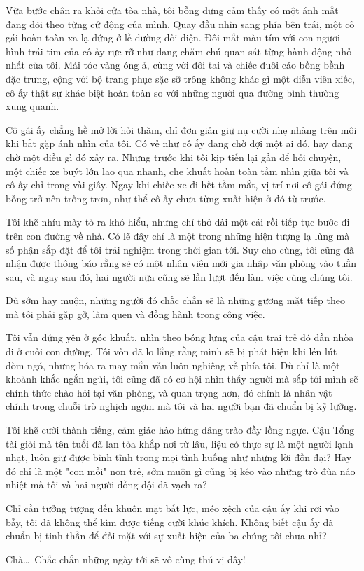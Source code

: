 \documentclass[../main.tex]{subfiles}
\begin{document}
Vừa bước chân ra khỏi cửa tòa nhà, tôi bỗng dưng cảm thấy có một ánh mắt đang dõi theo từng cử động của mình. Quay đầu nhìn sang phía bên trái, một cô gái hoàn toàn xa lạ đứng ở lề đường đối diện. Đôi mắt màu tím với con ngươi hình trái tim của cô ấy rực rỡ như đang chăm chú quan sát từng hành động nhỏ nhất của tôi. Mái tóc vàng óng ả, cùng với đôi tai và chiếc đuôi cáo bồng bềnh đặc trưng, cộng với bộ trang phục sặc sỡ trông không khác gì một diễn viên xiếc, cô ấy thật sự khác biệt hoàn toàn so với những người qua đường bình thường xung quanh.

Cô gái ấy chẳng hề mở lời hỏi thăm, chỉ đơn giản giữ nụ cười nhẹ nhàng trên môi khi bắt gặp ánh nhìn của tôi. Có vẻ như cô ấy đang chờ đợi một ai đó, hay đang chờ một điều gì đó xảy ra. Nhưng trước khi tôi kịp tiến lại gần để hỏi chuyện, một chiếc xe buýt lớn lao qua nhanh, che khuất hoàn toàn tầm nhìn giữa tôi và cô ấy chỉ trong vài giây. Ngay khi chiếc xe đi hết tầm mắt, vị trí nơi cô gái đứng bỗng trở nên trống trơn, như thể cô ấy chưa từng xuất hiện ở đó từ trước.

Tôi khẽ nhíu mày tỏ ra khó hiểu, nhưng chỉ thở dài một cái rồi tiếp tục bước đi trên con đường về nhà. Có lẽ đây chỉ là một trong những hiện tượng lạ lùng mà số phận sắp đặt để tôi trải nghiệm trong thời gian tới. Suy cho cùng, tôi cũng đã nhận được thông báo rằng sẽ có một nhân viên mới gia nhập văn phòng vào tuần sau, và ngay sau đó, hai người nữa cũng sẽ lần lượt đến làm việc cùng chúng tôi.

Dù sớm hay muộn, những người đó chắc chắn sẽ là những gương mặt tiếp theo mà tôi phải gặp gỡ, làm quen và đồng hành trong công việc.


Tôi vẫn đứng yên ở góc khuất, nhìn theo bóng lưng của cậu trai trẻ đó dần nhòa đi ở cuối con đường. Tôi vốn đã lo lắng rằng mình sẽ bị phát hiện khi lén lút dòm ngó, nhưng hóa ra may mắn vẫn luôn nghiêng về phía tôi. Dù chỉ là một khoảnh khắc ngắn ngủi, tôi cũng đã có cơ hội nhìn thấy người mà sắp tới mình sẽ chính thức chào hỏi tại văn phòng, và quan trọng hơn, đó chính là nhân vật chính trong chuỗi trò nghịch ngợm mà tôi và hai người bạn đã chuẩn bị kỹ lưỡng.

Tôi khẽ cười thành tiếng, cảm giác hào hứng dâng trào đầy lồng ngực. Cậu Tổng tài giỏi mà tên tuổi đã lan tỏa khắp nơi từ lâu, liệu có thực sự là một người lạnh nhạt, luôn giữ được bình tĩnh trong mọi tình huống như những lời đồn đại? Hay đó chỉ là một "con mồi" non trẻ, sớm muộn gì cũng bị kéo vào những trò đùa náo nhiệt mà tôi và hai người đồng đội đã vạch ra?

Chỉ cần tưởng tượng đến khuôn mặt bất lực, méo xệch của cậu ấy khi rơi vào bẫy, tôi đã không thể kìm được tiếng cười khúc khích. Không biết cậu ấy đã chuẩn bị tinh thần để đối mặt với sự xuất hiện của ba chúng tôi chưa nhỉ?

Chà\dots\ Chắc chắn những ngày tới sẽ vô cùng thú vị đây!
\end{document}
